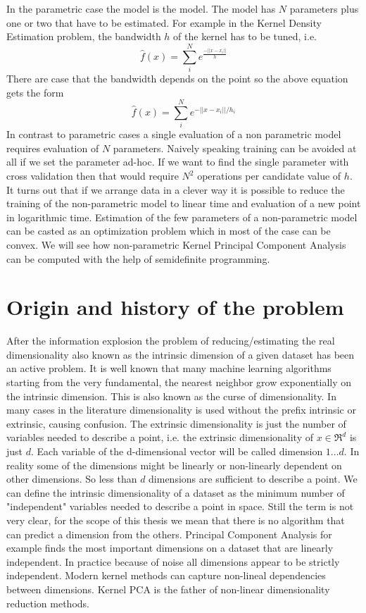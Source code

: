 \documentclass[12pt,letterpaper,doublespaced,ETD,dvips,proposal]{gtthesis}
\begin{document}
\begin{Body}
In the parametric case the model is the model. The model has $N$
parameters plus one or two that have to be estimated. For example in
the Kernel Density Estimation problem, the bandwidth $h$ of the
kernel has to be tuned, i.e.
\begin{equation}
\hat{f}(x)=\sum_{i}^{N}e^{\frac{-||x-x_i||}{h}}
\end{equation}
There are case that the bandwidth depends on the point so the above
equation gets the form
\begin{equation}
\hat{f}(x)=\sum_{i}^{N}e^{-||x-x_i||/h_i}
\end{equation}
In contrast to parametric cases a single evaluation of a non
parametric model requires evaluation of $N$ parameters. Naively
speaking training can be avoided at all if we set the parameter
ad-hoc. If we want to find the single parameter with cross
validation then that would require $N^2$ operations per candidate
value of $h$. It turns out that if we arrange data in a clever way
it is possible to reduce the training of the non-parametric model to
linear time and evaluation of a new point in logarithmic time.
Estimation of the few parameters of a non-parametric model can be
casted as an optimization problem which in most of the case can be
convex. We will see how non-parametric Kernel Principal Component
Analysis can be computed with the help of semidefinite programming.

\section{Origin and history of the problem}
\label{origin}

After the information explosion the problem of reducing/estimating
the real dimensionality also known as the intrinsic dimension of a
given dataset has been an active problem. It is well known that many
machine learning algorithms starting from the very fundamental, the
nearest neighbor grow exponentially on the intrinsic dimension. This
is also known as the curse of dimensionality. In many cases in the
literature dimensionality is used without the prefix intrinsic or
extrinsic, causing confusion. The extrinsic dimensionality is just
the number of variables needed to describe a point, i.e. the
extrinsic dimensionality of $x\in \Re^d$ is just $d$. Each variable
of the d-dimensional vector will be called dimension $1\dots d$. In
reality some of the dimensions might be linearly or non-linearly
dependent on other dimensions. So less than $d$ dimensions are
sufficient to describe a point. We can define the intrinsic
dimensionality of a dataset as the minimum number of "independent"
variables needed to describe a point in space. Still the term is not
very clear, for the scope of this thesis we mean that there is no
algorithm that can predict a dimension from the others. Principal
Component Analysis for example finds the most important dimensions
on a dataset that are linearly independent. In practice because of
noise all dimensions appear to be strictly independent.  Modern
kernel methods can capture non-lineal dependencies between
dimensions. Kernel PCA is the father of non-linear dimensionality
reduction methods.


\end{Body}
\end{document}
